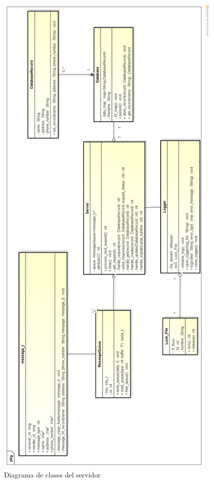 \documentclass[11pt,spanish,a4paper,openany,notitlepage]{article}
\begin{document}
\newpage

\begin{figure}[H]
\begin{center}
\includegraphics[width=310pt]{clases_servidor.png}
\caption{Diagrama de clases del servidor}
\end{center}
\end{figure}

\newpage
\end{document}
